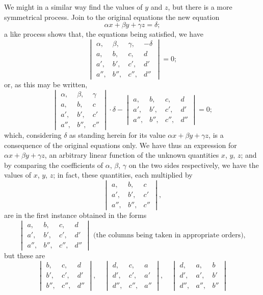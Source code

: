 \documentclass[12pt,a4paper,oneside]{book}
\begin{document}
\newpage
We might in a similar way find the values of $y$ and $z$, but there is a more symmetrical process. Join to the original equations the new equation
\[
\alpha x + \beta y + \gamma z = \delta;
\]
a like process shows that, the equations being satisfied, we have
\[
\begin{vmatrix} \alpha, & \beta, & \gamma, & -\delta \\ a, & b, & c, & d \\ a', & b', & c', & d' \\ a'', & b'', & c'', & d'' \end{vmatrix} = 0;
\]
or, as this may be written,
\[
\begin{vmatrix} \alpha, & \beta, & \gamma \\ a, & b, & c \\ a', & b', & c' \\ a'', & b'', & c'' \end{vmatrix} \cdot \delta - \begin{vmatrix} a, & b, & c, & d \\ a', & b', & c', & d' \\ a'', & b'', & c'', & d'' \end{vmatrix} = 0;
\]
which, considering $\delta$ as standing herein for its value $\alpha x+\beta y+\gamma z$, is a consequence of the original equations only. We have thus an expression for $\alpha x+\beta y+\gamma z$, an arbitrary linear function of the unknown quantities $x$, $y$, $z$; and by comparing the coefficients of $\alpha$, $\beta$, $\gamma$ on the two sides respectively, we have the values of $x$, $y$, $z$; in fact, these quantities, each multiplied by
\[
\begin{vmatrix} a, & b, & c \\ a', & b', & c' \\ a'', & b'', & c'' \end{vmatrix},
\]
are in the first instance obtained in the forms
\[
\begin{vmatrix} a, & b, & c, & d \\ a', & b', & c', & d' \\ a'', & b'', & c'', & d'' \end{vmatrix} \text{ (the columns being taken in appropriate orders)},
\]
but these are
\[
\begin{vmatrix} b, & c, & d \\ b', & c', & d' \\ b'', & c'', & d'' \end{vmatrix},\quad \begin{vmatrix} d, & c, & a \\ d', & c', & a' \\ d'', & c'', & a'' \end{vmatrix},\quad \begin{vmatrix} d, & a, & b \\ d', & a', & b' \\ d'', & a'', & b'' \end{vmatrix}
\]
\end{document}
